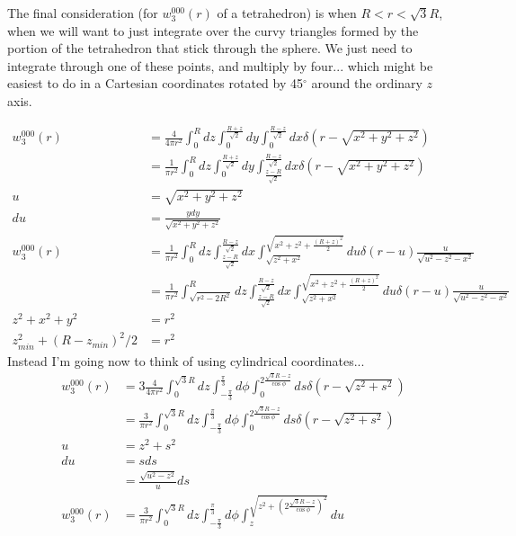 \documentclass[letterpaper,twocolumn,amsmath,amssymb,pre]{revtex4-1}
\begin{document}
The final consideration (for $w_3^{000}(r)$ of a tetrahedron) is when
$R < r < \sqrt{3}R$, when we will want to just integrate over the
curvy triangles formed by the portion of the tetrahedron that stick
through the sphere.  We just need to integrate through one of these
points, and multiply by four... which might be easiest to do in a
Cartesian coordinates rotated by 45$^\circ$ around the ordinary $z$
axis.
\begin{widetext}
\begin{align}
  w_3^{000}(r)
  &=
  \frac4{4\pi r^2}
  \int_{0}^R dz
  \int_0^{\frac{R+z}{\sqrt{2}}} dy
  \int_0^{\frac{R-z}{\sqrt{2}}} dx
  \delta(r-\sqrt{x^2+y^2+z^2})
  \\
  &=
  \frac1{\pi r^2}
  \int_{0}^R dz
  \int_0^{\frac{R+z}{\sqrt{2}}} dy
  \int_{\frac{z-R}{\sqrt{2}}}^{\frac{R-z}{\sqrt{2}}} dx
  \delta(r-\sqrt{x^2+y^2+z^2})
  \\
  u&= \sqrt{x^2+y^2+z^2}\\
  du &= \frac{ydy}{\sqrt{x^2+y^2+z^2}}
  \\
  w_3^{000}(r)
  &=
  \frac1{\pi r^2}
  \int_{0}^R dz
  \int_{\frac{z-R}{\sqrt{2}}}^{\frac{R-z}{\sqrt{2}}} dx
  \int_{\sqrt{z^2+x^2}}^{\sqrt{x^2+z^2+\frac{(R+z)^2}{2}}} du
  \delta(r-u)\frac{u}{\sqrt{u^2-z^2-x^2}}
  \\
  &=
  \frac1{\pi r^2}
  \int_{\sqrt{r^2-2R^2}}^R dz
  \int_{\frac{z-R}{\sqrt{2}}}^{\frac{R-z}{\sqrt{2}}} dx
  \int_{\sqrt{z^2+x^2}}^{\sqrt{x^2+z^2+\frac{(R+z)^2}{2}}} du
  \delta(r-u)\frac{u}{\sqrt{u^2-z^2-x^2}}
  \\
  z^2+x^2+y^2 &= r^2 \\
  z_{min}^2 + (R-z_{min})^2/2 &= r^2
\end{align}
Instead I'm going now to think of using cylindrical coordinates...
\begin{align}
  w_3^{000}(r) &= 3\frac{4}{4\pi r^2}
  \int_0^{\sqrt{3}R}dz\int_{-\frac{\pi}{3}}^{\frac{\pi}{3}}d\phi\int_0^{2\frac{\sqrt{3}R-z}{\cos\phi}} ds
  \delta(r-\sqrt{z^2+s^2})
  \\
  &= \frac{3}{\pi r^2}
  \int_0^{\sqrt{3}R}dz\int_{-\frac{\pi}{3}}^{\frac{\pi}{3}}d\phi\int_0^{2\frac{\sqrt{3}R-z}{\cos\phi}} ds
  \delta(r-\sqrt{z^2+s^2})
  \\
  u &= z^2+s^2 \\
  du &= sds \\
  &= \frac{\sqrt{u^2-z^2}}{u}ds
  \\
  w_3^{000}(r)
  &= \frac{3}{\pi r^2}
  \int_0^{\sqrt{3}R}dz\int_{-\frac{\pi}{3}}^{\frac{\pi}{3}}d\phi\int_{z}^{\sqrt{z^2+\left(2\frac{\sqrt{3}R-z}{\cos\phi}\right)^2}} du

\end{align}
\end{widetext}
\end{document}
